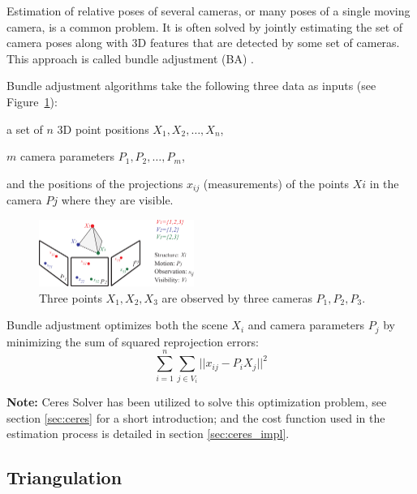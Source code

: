 Estimation of relative poses of several cameras, or many poses of a single moving camera, is a common problem. It is often solved by jointly estimating the set of camera poses along with 3D features that are detected by some set of cameras. This approach is called bundle adjustment (BA) \cite{BA}.

Bundle adjustment algorithms take the following three data as inputs (see Figure~\ref{fig:BA}):
\begin{itemize*}
 \item a set of $n$ 3D point positions $X_1, X_2, \dots, X_n$,
 \item $m$ camera parameters $P_1, P_2, \dots, P_m$,
 \item and the positions of the projections $x_{ij}$ (measurements) of the points $Xi$ in the camera $Pj$ where they are visible.
\end{itemize*}

\begin{figure}[!htbp]
 \centering
 \includegraphics[width=0.45\textwidth]{images/BA.pdf}
 \caption{Three points $X_1, X_2, X_3$ are observed by three cameras $P_1, P_2, P_3$.}
 \label{fig:BA}
\end{figure}

\noindent
Bundle adjustment optimizes both the scene $X_i$ and camera parameters $P_j$ by minimizing the sum of squared reprojection errors:
\begin{equation}
 \sum _{i=1}^{n}\sum _{j\in V_{i}} ||x_{ij}-P_{i}X_{j}||^2
\end{equation}

\noindent
\textbf{Note:} Ceres Solver has been utilized to solve this optimization problem, see section \ref{sec:ceres} for a short introduction; and the cost function used in the estimation process is detailed in section \ref{sec:ceres_impl}.


\subsection{Triangulation}
\label{sec:triangulation}

